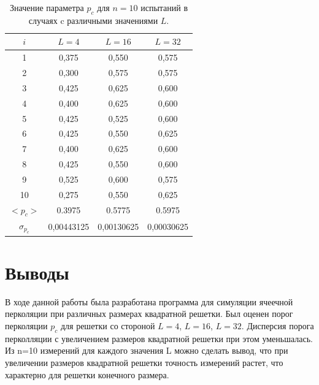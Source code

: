 \documentclass[14pt,a4paper,report]{ncc}
\begin{document}
\begin{table}[h!]
\caption{\label{tab:canonsummary}Значение параметра  $p_c$ для $n=10$ испытаний в случаях c различными значениями $L$.}
\begin{center}
\begin{tabular}{|c|c|c|c|}
\hline
$i$ & $L=4$ & $L=16$ & $L=32$ \\
\hline
1 & 0,375  & 0,550 & 0,575\\
2 & 0,300  & 0,575 & 0,575\\
3 & 0,425  & 0,625 & 0,600\\
4 & 0,400  & 0,625 & 0,600\\
5 & 0,425  & 0,525 & 0,600\\
6 & 0,425  & 0,550 & 0,625\\
7 & 0,400  & 0,625 & 0,600\\
8 & 0,425  & 0,550 & 0,600\\
9 & 0,525  & 0,600 & 0,575\\
10 & 0,275  & 0,550 & 0,625\\
\hline
$<p_c>$ & 0.3975 & 0.5775 & 0.5975 \\
\hline
$\sigma_{p_c}$ & 0,00443125 & 0,00130625 & 0,00030625 \\
\hline
\end{tabular}
\end{center}
\end{table} 



\newpage\section{Выводы}

В ходе данной работы была разработана программа для симуляции ячеечной перколяции при различных размерах квадратной решетки. Был оценен порог перколяции $p_c$ для решетки со стороной $L=4$, $L=16$, $L=32$. Дисперсия порога перколляции с увеличением размеров квадратной решетки при этом уменьшалась. Из n=10 измерений для каждого значения L можно сделать вывод, что при увеличении размеров квадратной решетки точность измерений растет, что характерно для решетки конечного размера.
\end{document}
